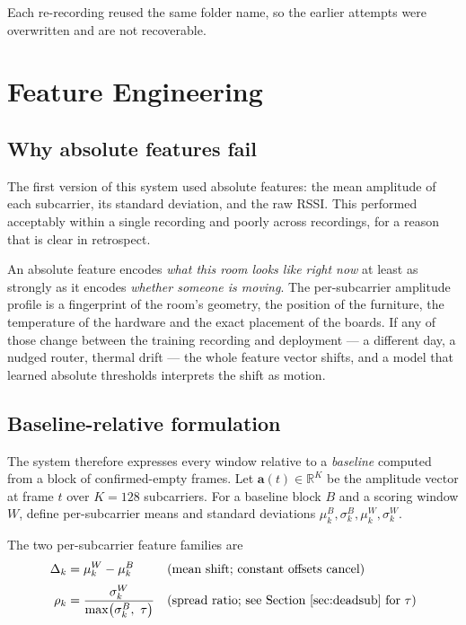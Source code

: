 \documentclass[11pt,a4paper]{article}
\begin{document}
\noindent
Each re-recording reused the same folder name, so the earlier attempts were
overwritten and are not recoverable.

\section{Feature Engineering}
\label{sec:features}

\subsection{Why absolute features fail}

The first version of this system used absolute features: the mean amplitude of
each subcarrier, its standard deviation, and the raw RSSI. This performed
acceptably within a single recording and poorly across recordings, for a reason
that is clear in retrospect.

An absolute feature encodes \emph{what this room looks like right now} at least
as strongly as it encodes \emph{whether someone is moving}. The per-subcarrier
amplitude profile is a fingerprint of the room's geometry, the position of the
furniture, the temperature of the hardware and the exact placement of the
boards. If any of those change between the training recording and deployment
--- a different day, a nudged router, thermal drift --- the whole feature
vector shifts, and a model that learned absolute thresholds interprets the
shift as motion.

\subsection{Baseline-relative formulation}

The system therefore expresses every window relative to a \emph{baseline}
computed from a block of confirmed-empty frames. Let $\mathbf{a}(t) \in
\mathbb{R}^{K}$ be the amplitude vector at frame $t$ over $K=128$ subcarriers.
For a baseline block $B$ and a scoring window $W$, define per-subcarrier means
and standard deviations $\mu^{B}_k, \sigma^{B}_k, \mu^{W}_k, \sigma^{W}_k$.

The two per-subcarrier feature families are
\begin{align}
  \Delta_k &= \mu^{W}_k - \mu^{B}_k
    &&\text{(mean shift; constant offsets cancel)}\\[2pt]
  \rho_k &= \frac{\sigma^{W}_k}{\max\!\left(\sigma^{B}_k,\ \tau\right)}
    &&\text{(spread ratio; see Section~\ref{sec:deadsub} for } \tau\text{)}
\end{align}
\end{document}
